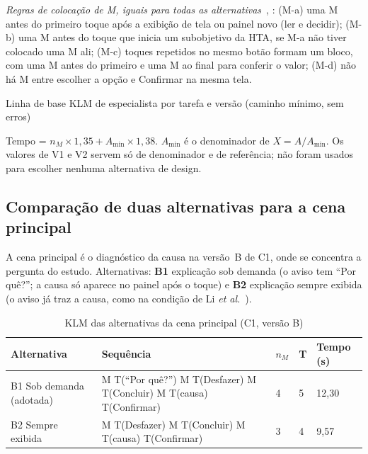 \documentclass[conference,onecolumn]{IEEEtran}
\begin{document}
\textit{Regras de colocação de M, iguais para todas as alternativas}~\cite{card1980}, \cite{preece2002}: (M-a) uma M antes do primeiro toque após a exibição de tela ou painel novo (ler e decidir); (M-b) uma M antes do toque que inicia um subobjetivo da HTA, se M-a não tiver colocado uma M ali; (M-c) toques repetidos no mesmo botão formam um bloco, com uma M antes do primeiro e uma M ao final para conferir o valor; (M-d) não há M entre escolher a opção e Confirmar na mesma tela.

\begin{table}[!h]
\caption{Linha de base KLM de especialista por tarefa e versão (caminho mínimo, sem erros)}
\label{tab:klm}
\centering
\scriptsize

\end{table}

Tempo = $n_M \times 1{,}35 + A_{\min} \times 1{,}38$. $A_{\min}$ é o denominador de $X = A/A_{\min}$. Os valores de V1 e V2 servem só de denominador e de referência; não foram usados para escolher nenhuma alternativa de design.

\subsection{Comparação de duas alternativas para a cena principal}
A cena principal é o diagnóstico da causa na versão~B de C1, onde se concentra a pergunta do estudo. Alternativas: \textbf{B1} explicação sob demanda (o aviso tem ``Por quê?''; a causa só aparece no painel após o toque) e \textbf{B2} explicação sempre exibida (o aviso já traz a causa, como na condição de Li \textit{et al.}~\cite{li2026}).

\begin{table}[!h]
\caption{KLM das alternativas da cena principal (C1, versão B)}
\label{tab:klm-alt}
\centering
\footnotesize
\begin{tabularx}{\textwidth}{@{}P{3.2cm}YP{0.6cm}P{0.6cm}P{1.0cm}@{}}
\toprule
\textbf{Alternativa} & \textbf{Sequência} & \textbf{$n_M$} & \textbf{T} & \textbf{Tempo (s)} \\
\midrule
B1 Sob demanda (adotada) & M T(``Por quê?'') M T(Desfazer) M T(Concluir) M T(causa) T(Confirmar) & 4 & 5 & 12,30 \\
B2 Sempre exibida & M T(Desfazer) M T(Concluir) M T(causa) T(Confirmar) & 3 & 4 & 9,57 \\
\bottomrule
\end{tabularx}
\end{table}
\end{document}
